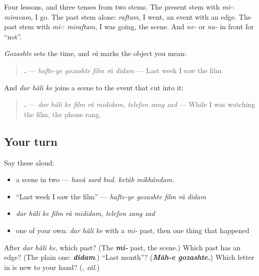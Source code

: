 \begin{grammarlens}[title={What you've built}]
Four lessons, and three tenses from two stems. The present stem with \emph{mi-}: \emph{miravam}, I go. The past stem alone: \emph{raftam}, I went, an event with an edge. The past stem with \emph{mi-}: \emph{miraftam}, I was going, the scene. And \emph{ne-} or \emph{na-} in front for \textquotedblleft{}not\textquotedblright{}.

\emph{Gozashte} sets the time, and \emph{râ} marks the object you mean:

\begin{quote}
\textbf{    .} — \emph{hafte-ye gozashte film râ didam} — Last week I saw the film.
\end{quote}

And \emph{dar hâli ke} joins a scene to the event that cut into it:

\begin{quote}
\textbf{        .} — \emph{dar hâli ke film râ mididam, telefon zang zad} — While I was watching the film, the phone rang.
\end{quote}
\end{grammarlens}

\subsection*{Your turn}
Say these aloud:

\begin{itemize}
\raggedright
  \item a scene in two — \emph{havâ sard bud. ketâb mikhândam.}
  \item \textquotedblleft{}Last week I saw the film\textquotedblright{} — \emph{hafte-ye gozashte film râ didam}
  \item \emph{dar hâli ke film râ mididam, telefon zang zad}
  \item one of your own: \emph{dar hâli ke} with a \emph{mi-} past, then one thing that happened
\end{itemize}

\begin{tcolorbox}[breakable,colback=teal!4,colframe=teal!35!black,title={Before you move on}]
After \emph{dar hâli ke}, which past? (The \emph{\textbf{mi-}} past, the scene.) Which past has an edge? (The plain one: \emph{\textbf{didam}}.) \textquotedblleft{}Last month\textquotedblright{}? (\emph{\textbf{Mâh-e gozashte.}}) Which letter in \textbf{} is new to your hand? (\textbf{}, \emph{zâl}.)
\end{tcolorbox}
